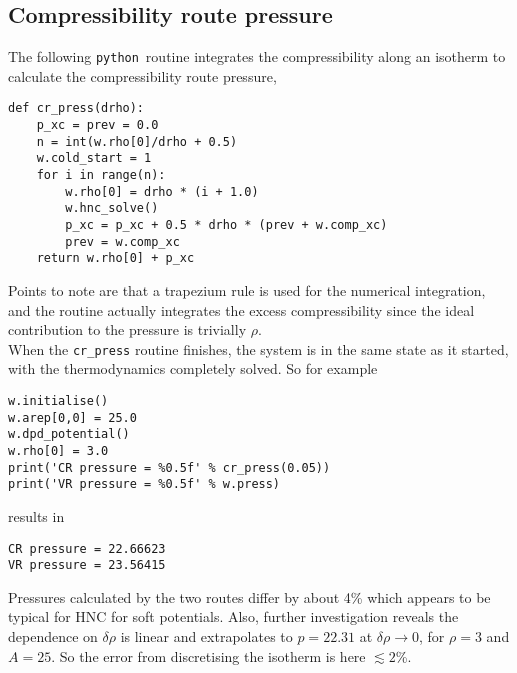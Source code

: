 \documentclass[12pt,a4paper]{article}
\newcommand{\alt}{\lesssim}
\newcommand{\python}{{\tt python}}
\begin{document}
\subsection{Compressibility route pressure}
%
The following \python\ routine integrates the compressibility along an
isotherm to calculate the compressibility route pressure,
%
\begin{verbatim}
def cr_press(drho):
    p_xc = prev = 0.0
    n = int(w.rho[0]/drho + 0.5)
    w.cold_start = 1
    for i in range(n):
        w.rho[0] = drho * (i + 1.0)
        w.hnc_solve()
        p_xc = p_xc + 0.5 * drho * (prev + w.comp_xc)
        prev = w.comp_xc
    return w.rho[0] + p_xc
\end{verbatim}
%
Points to note are that a trapezium rule is used for the numerical
integration, and the routine actually integrates the excess
compressibility since the ideal contribution to the pressure is
trivially $\rho$.\\

When the \verb+cr_press+ routine finishes, the
system is in the same state as it started, with the thermodynamics
completely solved.  So for example
%
\begin{verbatim}
w.initialise()
w.arep[0,0] = 25.0
w.dpd_potential()
w.rho[0] = 3.0
print('CR pressure = %0.5f' % cr_press(0.05))
print('VR pressure = %0.5f' % w.press)
\end{verbatim}
%
results in
%
\begin{verbatim}
CR pressure = 22.66623
VR pressure = 23.56415
\end{verbatim}
%
Pressures calculated by the two routes differ by about 4\%
which appears to be typical for HNC for soft potentials.  Also,
further investigation reveals the dependence on $\delta\rho$ is linear
and extrapolates to $p=22.31$ at $\delta\rho\to0$, for $\rho=3$ and
$A=25$.  So the error from discretising the isotherm is here $\alt2$\%.
\end{document}
